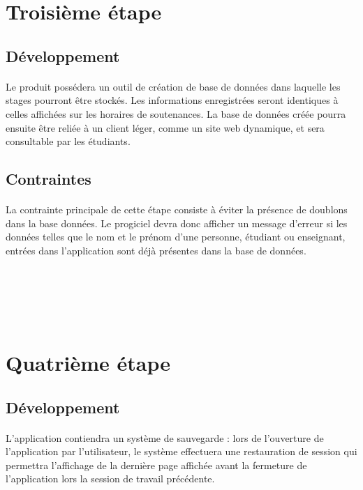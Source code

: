 \documentclass[a4paper,10pt]{report}
\begin{document}
      

    \section{Troisième étape}
      \subsection{Développement}
	\paragraph{}
	Le produit possédera un outil de création de base de données dans laquelle les stages pourront être stockés. 
	Les informations enregistrées seront identiques à celles affichées sur les horaires de soutenances. 
	La base de données créée pourra ensuite être reliée à un client léger, comme un site web dynamique, et sera consultable par les étudiants.

      \subsection{Contraintes}
	\paragraph{}
	  La contrainte principale de cette étape consiste à éviter la présence de doublons dans la base données. 
	  Le progiciel devra donc afficher un message d'erreur si les données telles que le nom et le prénom d'une personne, étudiant ou enseignant, entrées dans l'application sont déjà présentes dans la base de données. 
      
      ~\\~\\~\\~\\
      
    \section{Quatrième étape}
      \subsection{Développement}
	\paragraph{}
	  L’application contiendra un système de sauvegarde : lors de l’ouverture de l’application par l’utilisateur, le système effectuera une restauration de session qui permettra l’affichage de la dernière page affichée avant la fermeture de l’application lors la session de travail précédente.
\end{document}
